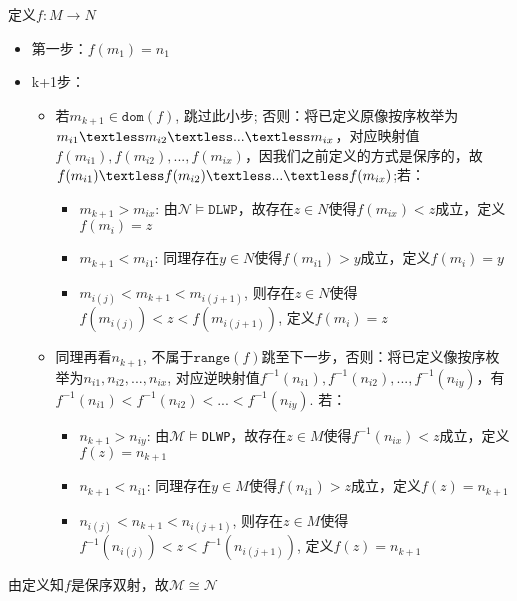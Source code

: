 \documentclass[UTF8, 9pt, a4paper]{ctexart}
\begin{document}
	定义$ f: M \rightarrow N$
		\begin{itemize}
			\item 第一步：$ f(m_1) = n_1 $
			\item k+1步：
				\begin{itemize}
					\item 若$ m_{k+1} \in \texttt{dom}(f) $, 跳过此小步; 否则：将已定义原像按序枚举为$  m_{i1} \textless m_{i2} \textless ...\textless m_{ix}  $，对应映射值 $ f(m_{i1}), f(m_{i2}), ..., f(m_{ix}) $，因我们之前定义的方式是保序的，故$ f(m_{i1}) \textless f(m_{i2}) \textless ... \textless f(m_{ix}) $;若：
					\begin{itemize}
						\item $ m_{k+1} > m_{ix}$: 由$ \mathcal{N} \models \texttt{DLWP} $，故存在$ z \in N $使得$ f(m_{ix}) < z $成立，定义$ f(m_i) = z $
						\item $ m_{k+1} < m_{i1} $: 同理存在$ y \in N $使得$ f(m_{i1}) > y $成立，定义$ f(m_i) = y $
						\item $ m_{i(j)} < m_{k+1} < m_{i(j+1)} $, 则存在$ z \in N $使得$ f(m_{i(j)}) < z < f(m_{i(j+1)}) $, 定义$ f(m_i) = z $
					\end{itemize}
				
					\item 同理再看$ n_{k+1} $, 不属于$ \texttt{range}(f) $跳至下一步，否则：将已定义像按序枚举为$ n_{i1}, n_{i2}, ..., n_{ix} $, 对应逆映射值$ f^{-1}(n_{i1}), f^{-1}(n_{i2}), ..., f^{-1}(n_{iy}) $，有$ f^{-1}(n_{i1}) < f^{-1}(n_{i2}) < ... < f^{-1}(n_{iy}) $. 若：
					\begin{itemize}
						\item $ n_{k+1} > n_{iy}$: 由$ \mathcal{M} \models$\texttt{DLWP}，故存在$ z \in M $使得$ f^{-1}(n_{ix}) < z $成立，定义$ f(z) = n_{k+1} $
						\item $ n_{k+1} < n_{i1} $: 同理存在$ y \in M $使得$ f(n_{i1}) > z $成立，定义$ f(z) = n_{k+1}  $
						\item $ n_{i(j)} < n_{k+1} < n_{i(j+1)} $, 则存在$ z \in M $使得$ f^{-1}(n_{i(j)}) < z < f^{-1}(n_{i(j+1)}) $, 定义$ f(z) = n_{k+1} $
					\end{itemize}
				\end{itemize}
		\end{itemize}
	
	由定义知$ f $是保序双射，故$ \mathcal{M} \cong \mathcal{N} $
	
\end{document}
